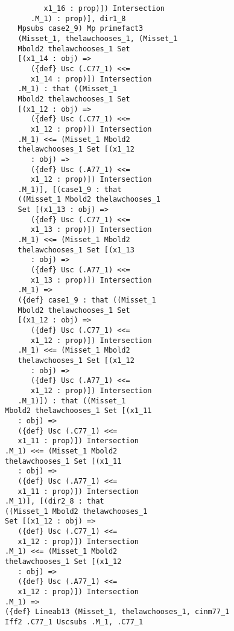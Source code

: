 \documentclass[12pt]{article}
\begin{document}
\begin{verbatim}
                      x1_16 : prop)]) Intersection 
                   .M_1) : prop)], dir1_8 
                Mpsubs case2_9) Mp primefact3 
                (Misset_1, thelawchooses_1, (Misset_1 
                Mbold2 thelawchooses_1 Set 
                [(x1_14 : obj) => 
                   ({def} Usc (.C77_1) <<= 
                   x1_14 : prop)]) Intersection 
                .M_1) : that ((Misset_1 
                Mbold2 thelawchooses_1 Set 
                [(x1_12 : obj) => 
                   ({def} Usc (.C77_1) <<= 
                   x1_12 : prop)]) Intersection 
                .M_1) <<= (Misset_1 Mbold2 
                thelawchooses_1 Set [(x1_12 
                   : obj) => 
                   ({def} Usc (.A77_1) <<= 
                   x1_12 : prop)]) Intersection 
                .M_1)], [(case1_9 : that 
                ((Misset_1 Mbold2 thelawchooses_1 
                Set [(x1_13 : obj) => 
                   ({def} Usc (.C77_1) <<= 
                   x1_13 : prop)]) Intersection 
                .M_1) <<= (Misset_1 Mbold2 
                thelawchooses_1 Set [(x1_13 
                   : obj) => 
                   ({def} Usc (.A77_1) <<= 
                   x1_13 : prop)]) Intersection 
                .M_1) => 
                ({def} case1_9 : that ((Misset_1 
                Mbold2 thelawchooses_1 Set 
                [(x1_12 : obj) => 
                   ({def} Usc (.C77_1) <<= 
                   x1_12 : prop)]) Intersection 
                .M_1) <<= (Misset_1 Mbold2 
                thelawchooses_1 Set [(x1_12 
                   : obj) => 
                   ({def} Usc (.A77_1) <<= 
                   x1_12 : prop)]) Intersection 
                .M_1)]) : that ((Misset_1 
             Mbold2 thelawchooses_1 Set [(x1_11 
                : obj) => 
                ({def} Usc (.C77_1) <<= 
                x1_11 : prop)]) Intersection 
             .M_1) <<= (Misset_1 Mbold2 
             thelawchooses_1 Set [(x1_11 
                : obj) => 
                ({def} Usc (.A77_1) <<= 
                x1_11 : prop)]) Intersection 
             .M_1)], [(dir2_8 : that 
             ((Misset_1 Mbold2 thelawchooses_1 
             Set [(x1_12 : obj) => 
                ({def} Usc (.C77_1) <<= 
                x1_12 : prop)]) Intersection 
             .M_1) <<= (Misset_1 Mbold2 
             thelawchooses_1 Set [(x1_12 
                : obj) => 
                ({def} Usc (.A77_1) <<= 
                x1_12 : prop)]) Intersection 
             .M_1) => 
             ({def} Lineab13 (Misset_1, thelawchooses_1, cinm77_1 
             Iff2 .C77_1 Uscsubs .M_1, .C77_1 

\end{verbatim}
\end{document}

